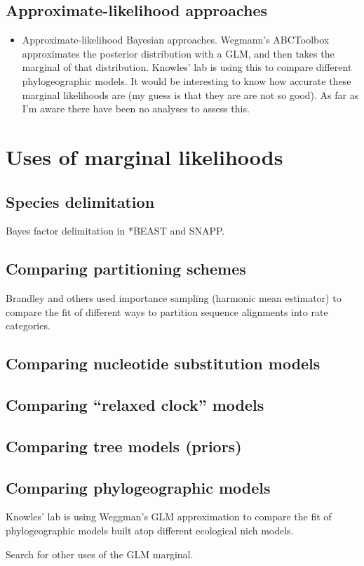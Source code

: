 \subsection{Approximate-likelihood approaches}

\begin{itemize}
    \item Approximate-likelihood Bayesian approaches. Wegmann's ABCToolbox
        approximates the posterior distribution with a GLM, and then takes the
        marginal of that distribution. Knowles' lab is using this to compare
        different phylogeographic models. It would be interesting to know how
        accurate these marginal likelihoods are (my guess is that they are are
        not so good). As far as I'm aware there have been no analyses to assess
        this.
\end{itemize}

\section{Uses of marginal likelihoods}

\subsection{Species delimitation}

Bayes factor delimitation in *BEAST and SNAPP.

\subsection{Comparing partitioning schemes}

Brandley and others used importance sampling (harmonic mean estimator) to
compare the fit of different ways to partition sequence alignments into rate
categories.

\subsection{Comparing nucleotide substitution models}

\subsection{Comparing ``relaxed clock'' models}

\subsection{Comparing tree models (priors)}

\subsection{Comparing phylogeographic models}

Knowles' lab is using Weggman's GLM approximation to compare the fit of
phylogeographic models built atop different ecological nich models.

Search for other uses of the GLM marginal.
